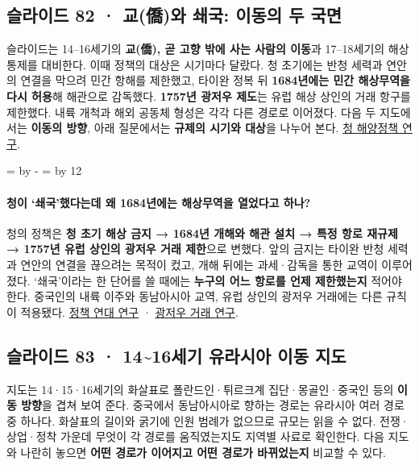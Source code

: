 \documentclass[10pt,a4paper]{article}
\newcommand{\ReserveQuestionSpace}{%
  \par\begingroup
  \dimen0=\pagegoal \advance\dimen0 by -\pagetotal
  \dimen2=\baselineskip \multiply\dimen2 by 12
  \ifdim\dimen0<\dimen2 \newpage\fi
  \endgroup}
\begin{document}
\subsection{슬라이드 82 · 교(僑)와 쇄국: 이동의 두 국면}
슬라이드는 14–16세기의 \textbf{교(僑), 곧 고향 밖에 사는 사람의 이동}과 17–18세기의 해상 통제를 대비한다. 이때 정책의 대상은 시기마다 달랐다. 청 초기에는 반청 세력과 연안의 연결을 막으려 민간 항해를 제한했고, 타이완 정복 뒤 \textbf{1684년에는 민간 해상무역을 다시 허용}해 해관으로 감독했다. \textbf{1757년 광저우 제도}는 유럽 해상 상인의 거래 항구를 제한했다. 내륙 개척과 해외 공동체 형성은 각각 다른 경로로 이어졌다. 다음 두 지도에서는 \textbf{이동의 방향}, 아래 질문에서는 \textbf{규제의 시기와 대상}을 나누어 본다. \href{https://www.jstor.org/stable/j.ctt6wqd6t}{청 해양정책 연구}.\par

\ReserveQuestionSpace
\paragraph{청이 ‘쇄국’했다는데 왜 1684년에는 해상무역을 열었다고 하나?}
청의 정책은 \textbf{청 초기 해상 금지 → 1684년 개해와 해관 설치 → 특정 항로 재규제 → 1757년 유럽 상인의 광저우 거래 제한}으로 변했다. 앞의 금지는 타이완 반청 세력과 연안의 연결을 끊으려는 목적이 컸고, 개해 뒤에는 과세·감독을 통한 교역이 이루어졌다. ‘쇄국’이라는 한 단어를 쓸 때에는 \textbf{누구의 어느 항로를 언제 제한했는지} 적어야 한다. 중국인의 내륙 이주와 동남아시아 교역, 유럽 상인의 광저우 거래에는 다른 규칙이 적용됐다. \href{https://www.jstor.org/stable/j.ctt6wqd6t}{정책 연대 연구} · \href{https://www.cambridge.org/core/journals/journal-of-global-history/article/empire-of-impartiality-managing-indebtedness-to-foreigners-in-eighteenthcentury-china/E1535F250E1D87BF527EC8F7F37E4F59}{광저우 거래 연구}.\par

\subsection{슬라이드 83 · 14\textasciitilde{}16세기 유라시아 이동 지도}
지도는 14·15·16세기의 화살표로 폴란드인·튀르크계 집단·몽골인·중국인 등의 \textbf{이동 방향}을 겹쳐 보여 준다. 중국에서 동남아시아로 향하는 경로는 유라시아 여러 경로 중 하나다. 화살표의 길이와 굵기에 인원 범례가 없으므로 규모는 읽을 수 없다. 전쟁·상업·정착 가운데 무엇이 각 경로를 움직였는지도 지역별 사료로 확인한다. 다음 지도와 나란히 놓으면 \textbf{어떤 경로가 이어지고 어떤 경로가 바뀌었는지} 비교할 수 있다.\par
\end{document}
